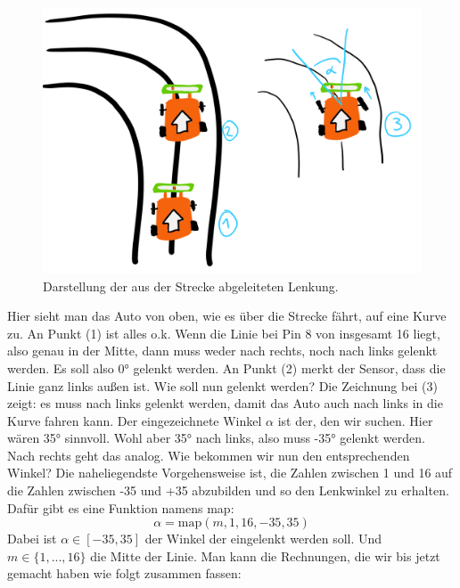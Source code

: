 	\begin{figure}[H]
		\centering
		\label{auto1}
		\includegraphics[scale=0.6]{img/Sensor/Auto1.png}
		\caption{Darstellung der aus der Strecke abgeleiteten Lenkung.}
	\end{figure}

	
	Hier sieht man das Auto von oben, wie es über die Strecke fährt, auf eine Kurve zu. An Punkt (1) ist alles o.k. Wenn die Linie bei Pin 8 von insgesamt 16 liegt, also genau in der Mitte, dann muss weder nach rechts, noch nach links gelenkt werden. Es soll also 0° gelenkt werden. An Punkt (2) merkt der Sensor, dass die Linie ganz links außen ist. Wie soll nun gelenkt werden? Die Zeichnung bei (3) zeigt: es muss nach links gelenkt werden, damit das Auto auch nach links in die Kurve fahren kann. Der eingezeichnete Winkel $\alpha$ ist der, den wir suchen. Hier wären 35° sinnvoll. Wohl aber 35° nach links, also muss -35° gelenkt werden. Nach rechts geht das analog.  Wie bekommen wir nun den entsprechenden Winkel? Die naheliegendste Vorgehensweise ist, die Zahlen zwischen 1 und 16 auf die Zahlen zwischen -35 und +35 abzubilden und so den Lenkwinkel zu erhalten. Dafür gibt es eine Funktion namens map:
	$$\alpha = \text{map}(m, 1, 16, -35, 35)$$
	\newpage
	Dabei ist $\alpha \in [-35, 35]$ der Winkel der eingelenkt werden soll. Und $m \in \{1,...,16\}$ die Mitte der Linie. Man kann die Rechnungen, die wir bis jetzt gemacht haben wie folgt zusammen fassen:
	
